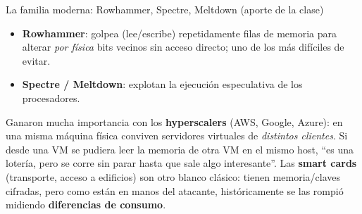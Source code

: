 \documentclass[11pt,a4paper]{article}
\begin{document}
\begin{practbox}{La familia moderna: Rowhammer, Spectre, Meltdown (aporte de la clase)}
\begin{itemize}[leftmargin=1.4em,itemsep=1pt]
  \item \textbf{Rowhammer}: golpea (lee/escribe) repetidamente filas de memoria para alterar
        \emph{por física} bits vecinos sin acceso directo; uno de los más difíciles de evitar.
  \item \textbf{Spectre / Meltdown}: explotan la ejecución especulativa de los procesadores.
\end{itemize}
Ganaron mucha importancia con los \textbf{hyperscalers} (AWS, Google, Azure): en una misma
máquina física conviven servidores virtuales de \emph{distintos clientes}. Si desde una VM se
pudiera leer la memoria de otra VM en el mismo host, ``es una lotería, pero se corre sin parar
hasta que sale algo interesante''. Las \textbf{smart cards} (transporte, acceso a edificios) son
otro blanco clásico: tienen memoria/claves cifradas, pero como están en manos del atacante,
históricamente se las rompió midiendo \textbf{diferencias de consumo}.
\end{practbox}
\end{document}

